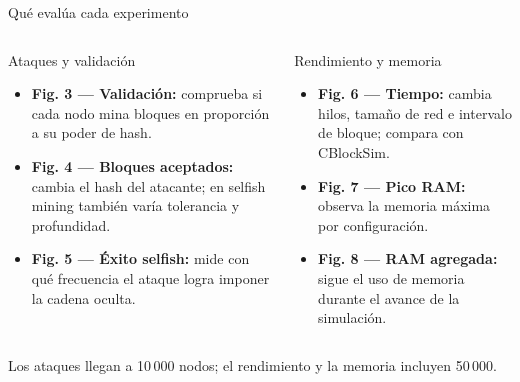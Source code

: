 \documentclass[aspectratio=169,11pt]{beamer}
\begin{document}
\begin{frame}{Qué evalúa cada experimento}
\small
\begin{columns}[T,onlytextwidth]
\begin{block}{Ataques y validación}
\begin{itemize}
  \item \textbf{Fig. 3 — Validación:} comprueba si cada nodo mina bloques en proporción a su poder de hash.
  \item \textbf{Fig. 4 — Bloques aceptados:} cambia el hash del atacante; en selfish mining también varía tolerancia y profundidad.
  \item \textbf{Fig. 5 — Éxito selfish:} mide con qué frecuencia el ataque logra imponer la cadena oculta.
\end{itemize}
\end{block}
\begin{block}{Rendimiento y memoria}
\begin{itemize}
  \item \textbf{Fig. 6 — Tiempo:} cambia hilos, tamaño de red e intervalo de bloque; compara con CBlockSim.
  \item \textbf{Fig. 7 — Pico RAM:} observa la memoria máxima por configuración.
  \item \textbf{Fig. 8 — RAM agregada:} sigue el uso de memoria durante el avance de la simulación.
\end{itemize}
\end{block}
\end{columns}
\vspace{.3em}
\begin{center}\small Los ataques llegan a 10\,000 nodos; el rendimiento y la memoria incluyen 50\,000.\end{center}
\end{frame}
\end{document}
